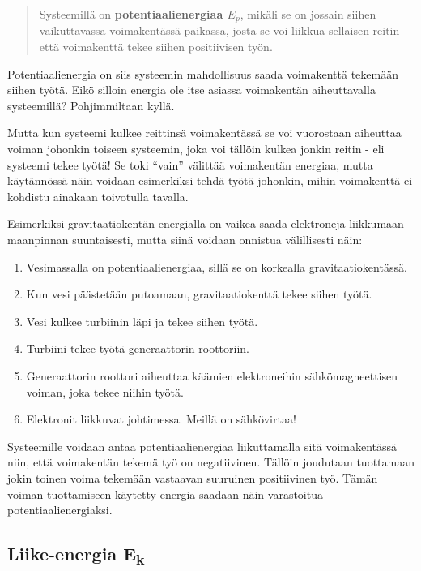 \documentclass[12pt,a4paper,finnish]{book}
\begin{document}
\begin{quotation}
Systeemillä on \textbf{potentiaalienergiaa $E_p$}, mikäli se on jossain siihen vaikuttavassa voimakentässä 
paikassa, josta se voi liikkua sellaisen reitin että voimakenttä tekee siihen positiivisen työn.
\end{quotation}

Potentiaalienergia on siis systeemin mahdollisuus saada voimakenttä tekemään siihen työtä. Eikö silloin 
energia ole itse asiassa voimakentän aiheuttavalla systeemillä? Pohjimmiltaan kyllä.

Mutta kun systeemi kulkee reittinsä voimakentässä se voi vuorostaan aiheuttaa voiman johonkin toiseen 
systeemin, joka voi tällöin kulkea jonkin reitin - eli systeemi tekee työtä! Se toki ``vain'' välittää 
voimakentän energiaa, mutta käytännössä näin voidaan esimerkiksi tehdä työtä johonkin, mihin voimakenttä 
ei kohdistu ainakaan toivotulla tavalla.

Esimerkiksi gravitaatiokentän energialla on vaikea saada elektroneja liikkumaan maanpinnan suuntaisesti, mutta 
siinä voidaan onnistua välillisesti näin:

\begin{enumerate}
 \item Vesimassalla on potentiaalienergiaa, sillä se on korkealla gravitaatiokentässä.
 \item Kun vesi päästetään putoamaan, gravitaatiokenttä tekee siihen työtä.
 \item Vesi kulkee turbiinin läpi ja tekee siihen työtä.
 \item Turbiini tekee työtä generaattorin roottoriin.
 \item Generaattorin roottori aiheuttaa käämien elektroneihin sähkömagneettisen voiman, joka tekee niihin 
 työtä.
 \item Elektronit liikkuvat johtimessa. Meillä on sähkövirtaa!
\end{enumerate}

Systeemille voidaan antaa potentiaalienergiaa liikuttamalla sitä voimakentässä niin, että voimakentän 
tekemä työ on negatiivinen. Tällöin joudutaan tuottamaan jokin toinen voima tekemään vastaavan 
suuruinen positiivinen työ. Tämän voiman tuottamiseen käytetty energia saadaan näin varastoitua 
potentiaalienergiaksi.

\subsection{Liike-energia E\textsubscript{k}}
\end{document}
